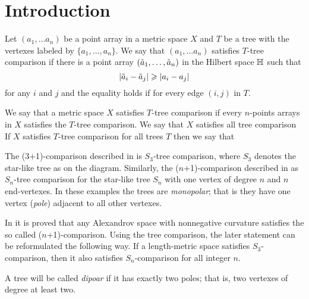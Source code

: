 \section{Introduction}\label{sec:intro}

Let $(a_1,\dots a_n)$ be a point array in a metric space $X$ and $T$ be a 
tree with the vertexes labeled by $\{a_1,\dots,a_n\}$.
We say that $(a_1,\dots a_n)$  satisfies $T$-tree comparison if there is a point array $(\~a_1,\dots, \~a_n)$ in the Hilbert space $\HH$ such that 
\[|\~a_i-\~a_j|\ge|a_i-a_j|\]
for any $i$ and $j$ and the equality holds if for every edge $(i,j)$ in $T$.

We say that a metric space $X$ satisfies $T$-tree comparison if 
every $n$-points arrays in $X$ satisfies the $T$-tree comparison.
We say that  $X$ satisfies all tree comparison
If $X$ satisfies $T$-tree comparison for all trees $T$ then we say that 

\hide
\begin{wrapfigure}{r}{20 mm}
\end{wrapfigure}
\unhide

The (3+1)-comparison described in \cite{AKP} is $S_3$-tree comparison, where $S_3$ denotes the star-like tree as on the diagram.
Similarly, the ($n$+1)-comparison described in \cite{AKP} as $S_n$-tree comparison for the star-like tree $S_n$ with one vertex of degree $n$ and $n$ end-vertexes.
In these examples the trees are \emph{monopolar};
that is they have one vertex (\emph{pole}) adjacent to all other vertexes.

In \cite[4.1]{AKP} it is proved that any Alexandrov space with nonnegative curvature satisfies the so called  ($n$+1)-comparison.
Using the tree comparison, the later statement can be reformulated the following way.
If a length-metric space satisfies $S_3$-comparison, then it also satisfies $S_n$-comparison for all integer $n$.

A tree will be called \emph{dipoar} if it has exactly two poles;
that is, two vertexes of degree at least two.

